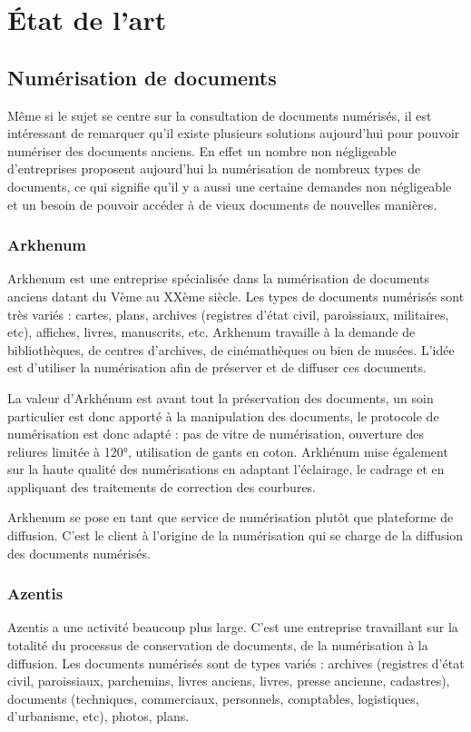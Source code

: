 \section{État de l'art}
\label{sec:etat_art}

    \subsection{Numérisation de documents}
    \label{subsec:numerisation}
    Même si le sujet se centre sur la consultation de documents numérisés, il est intéressant de remarquer qu’il existe plusieurs solutions aujourd’hui pour pouvoir numériser des documents anciens. En effet un nombre non négligeable d’entreprises proposent aujourd’hui la numérisation de nombreux types de documents, ce qui signifie qu’il y a aussi une certaine demandes non négligeable et un besoin de pouvoir accéder à de vieux documents de nouvelles manières.


        \subsubsection{Arkhenum}
        \label{subsubsec:arkhenum}
       Arkhenum est une entreprise spécialisée dans la numérisation de documents anciens datant du Vème au XXème siècle. Les types de documents numérisés sont très variés : cartes, plans, archives (registres d'état civil, paroissiaux, militaires, etc), affiches, livres, manuscrits, etc. Arkhenum travaille à la demande de bibliothèques, de centres d'archives, de cinémathèques ou bien de musées. L'idée est d'utiliser la numérisation afin de préserver et de diffuser ces documents.

        La valeur d'Arkhénum est avant tout la préservation des documents, un soin particulier est donc apporté à la manipulation des documents, le protocole de numérisation est donc adapté : pas de vitre de numérisation, ouverture des reliures limitée à 120°, utilisation de gants en coton. Arkhénum mise également sur la haute qualité des numérisations en adaptant l'éclairage, le cadrage et en appliquant des traitements de correction des courbures.

        Arkhenum se pose en tant que service de numérisation plutôt que plateforme de diffusion. C’est le client à l’origine de la numérisation qui se charge de la diffusion des documents numérisés. 

        \subsubsection{Azentis}
        \label{subsubsec:azentis}
        Azentis a une activité beaucoup plus large. C’est une entreprise travaillant sur la totalité du processus de conservation de documents, de la  numérisation à la diffusion. Les documents numérisés sont de types variés : archives (registres d'état civil, paroissiaux, parchemins, livres anciens, livres, presse ancienne, cadastres), documents (techniques, commerciaux, personnels, comptables, logistiques, d'urbanisme, etc), photos, plans.
    
